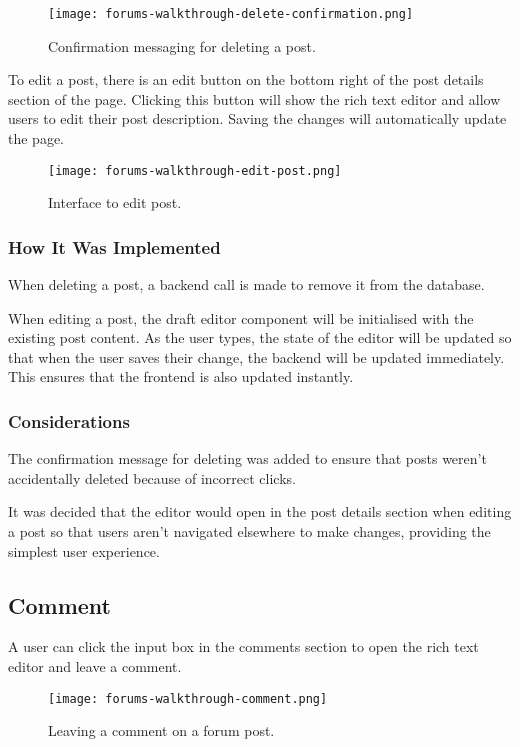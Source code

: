 \begin{figure}[h!]
    \texttt{[image: forums-walkthrough-delete-confirmation.png]}
    \centering
    \caption{Confirmation messaging for deleting a post.}
\end{figure}

To edit a post, there is an edit button on the bottom right of the post details section of the page.
Clicking this button will show the rich text editor and allow users to edit their post description.
Saving the changes will automatically update the page.

\begin{figure}[h!]
    \texttt{[image: forums-walkthrough-edit-post.png]}
    \centering
    \caption{Interface to edit post.}
\end{figure}

\subsubsection{How It Was Implemented}
When deleting a post, a backend call is made to remove it from the database.

When editing a post, the draft editor component will be initialised with the existing post content.
As the user types, the state of the editor will be updated so that when the user saves their change, the backend will be updated immediately.
This ensures that the frontend is also updated instantly.

\subsubsection{Considerations}
The confirmation message for deleting was added to ensure that posts weren't accidentally deleted because of incorrect clicks.

It was decided that the editor would open in the post details section when editing a post so that users aren't navigated elsewhere to make changes, providing the simplest user experience.

\subsection{Comment}
A user can click the input box in the comments section to open the rich text editor and leave a comment.

\begin{figure}[h!]
    \texttt{[image: forums-walkthrough-comment.png]}
    \centering
    \caption{Leaving a comment on a forum post.}
\end{figure}

